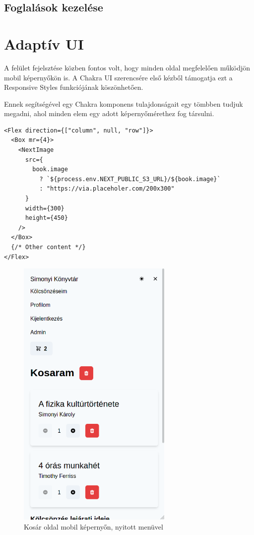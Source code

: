 \subsection{Foglalások kezelése}

\section{Adaptív UI}

A felület fejelsztése közben fontos volt, hogy minden oldal megfelelően működjön mobil képernyőkön is.
A Chakra UI szerencsére első kézből támogatja ezt a Responsive Styles funkciójának köszönhetően.

Ennek segítségével egy Chakra komponens tulajdonságait egy tömbben tudjuk megadni, ahol minden elem egy adott képernyőmérethez
fog társulni.

\begin{lstlisting}[caption=Chakra UI Responsive Styles használata]
<Flex direction={["column", null, "row"]}>
  <Box mr={4}>
    <NextImage
      src={
        book.image
          ? `${process.env.NEXT_PUBLIC_S3_URL}/${book.image}`
          : "https://via.placeholer.com/200x300"
      }
      width={300}
      height={450}
    />
  </Box>
  {/* Other content */}
</Flex>
\end{lstlisting}

\begin{figure}[!ht]
  \centering
  \includegraphics[width=75mm, keepaspectratio]{figures/cart-mobile.png}
  \caption{Kosár oldal mobil képernyőn, nyitott menüvel}
  \label{fig:CartMobile}
\end{figure}

